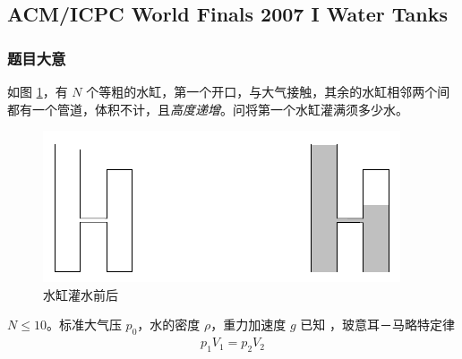 	
		\subsection{ACM/ICPC World Finals 2007 I Water Tanks}
			\subsubsection{题目大意}	
				
				如图 \ref{2007i}，有 $N$ 个等粗的水缸，第一个开口，与大气接触，其余的水缸相邻两个间都有一个管道，体积不计，且\emph{高度递增}。问将第一个水缸灌满须多少水。
				
				
				\begin{figure}[htb]
					\centering
					\includegraphics[width=0.7 \textwidth]{2007i.png}
					\caption{水缸灌水前后} \label{2007i}
				\end{figure}	
			
				$N \le 10$。标准大气压 $p_0$，水的密度 $\rho$，重力加速度 $g$%
				已知
				，玻意耳－马略特定律
				\begin{align}
					p_1 V_1 = p_2 V_2
				\end{align}
